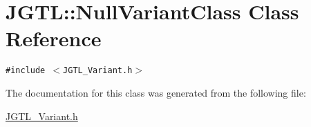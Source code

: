 \hypertarget{class_j_g_t_l_1_1_null_variant_class}{
\section{JGTL::Null\-Variant\-Class Class Reference}
\label{class_j_g_t_l_1_1_null_variant_class}
}
{\tt \#include $<$JGTL\_\-Variant.h$>$}



The documentation for this class was generated from the following file:\begin{CompactItemize}
\item 
\hyperlink{_j_g_t_l___variant_8h}{JGTL\_\-Variant.h}\end{CompactItemize}

